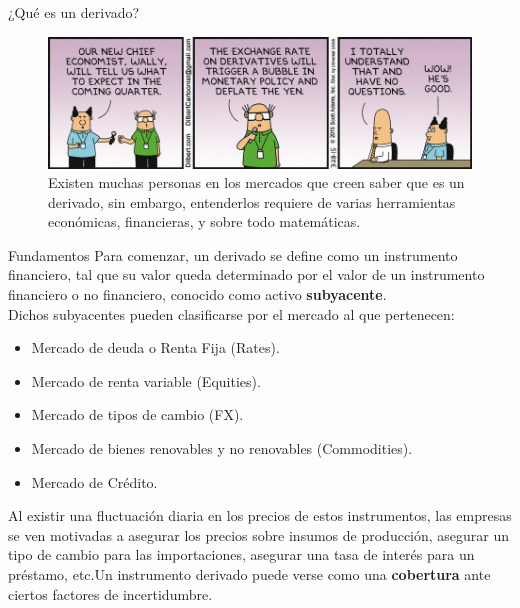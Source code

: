 \documentclass[11pt]{beamer}
\begin{document}
\begin{frame}{¿Qué es un derivado?}
	\begin{figure}
		\centering
		\includegraphics[width=1\linewidth]{dt150328}
		\caption{Existen muchas personas en los mercados que creen saber que es un derivado, sin embargo, entenderlos requiere de varias herramientas económicas, financieras, y sobre todo matemáticas.}
		\label{fig:dt150328}
	\end{figure}
	
\end{frame}


\begin{frame}{Fundamentos}
	Para comenzar, un derivado se define como un instrumento financiero, tal que su valor queda determinado por el valor de un instrumento financiero o no financiero, conocido como activo \textbf{subyacente}.\\
	Dichos subyacentes pueden clasificarse por el mercado al que pertenecen:
	\begin{itemize}
		\item Mercado de deuda o Renta Fija (Rates).
		\item Mercado de renta variable (Equities).
		\item Mercado de tipos de cambio (FX).
		\item Mercado de bienes renovables y no renovables (Commodities).
		\item Mercado de Crédito.
	\end{itemize}

Al existir una fluctuación diaria en los precios de estos instrumentos, las empresas se ven motivadas a asegurar los precios sobre insumos de producción, asegurar un tipo de cambio para las importaciones, asegurar una tasa de interés para un préstamo, etc.Un instrumento derivado puede verse como una \textbf{cobertura} ante ciertos factores de incertidumbre. 
\end{frame}
\end{document}
